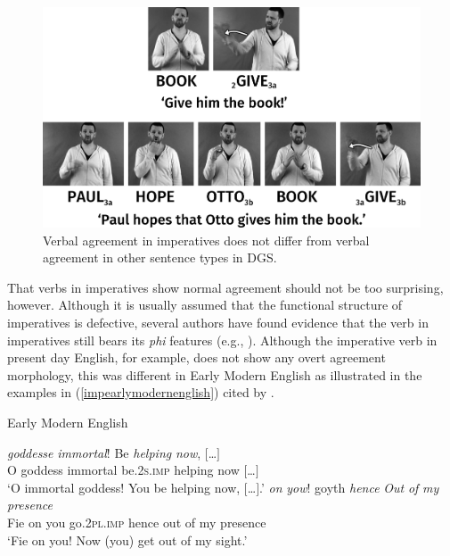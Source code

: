 \begin{figure}[bt]
\centering
	\includegraphics[width=1.0\textwidth]{inflectimpsw.jpg}
	\caption{Verbal agreement in imperatives does not differ from verbal agreement in other sentence types in DGS.}
	\label{fig:inflectimp}
\end{figure}

That verbs in imperatives show normal agreement should not be too surprising, however. Although it is usually assumed that the functional structure of imperatives is defective, several authors have found evidence that the verb in imperatives still bears its \textit{phi} features (e.g., \citealt{henry1995belfast, rupp2002syntax}). Although the imperative verb in present day English, for example, does not show any overt agreement morphology, this was different in Early Modern English as illustrated in the examples in (\ref{impearlymodernenglish}) cited by \citet[25]{rupp2002syntax}.

\begin{exe}
\ex Early Modern English \citep[25]{rupp2002syntax}\label{impearlymodernenglish}\begin{xlist} 
\ex {} {\textit{goddesse}} {\textit{immortal}!} {Be} {\textit{helping}} {\textit{now},} {$[$\dots$]$}  \\
{O} {goddess} {immortal} {be.\textsc{2s.imp}} {helping} {now} {$[$\dots$]$} \\
\trans `O immortal goddess! You be helping now, $[$\dots$]$.' \label{ex:impearlymodernenglisha}
\ex {} {\textit{on}} {\textit{yow}!} {goyth} {\textit{hence}} {\textit{Out}} {\textit{of}} {\textit{my}} {\textit{presence}}   \\
{Fie} {on} {you} {go.\textsc{2pl.imp}} {hence} {out} {of} {my} {presence} \\
\trans `Fie on you! Now (you) get out of my sight.' \label{ex:impearlymodernenglishb}
\end{xlist}
\end{exe}

